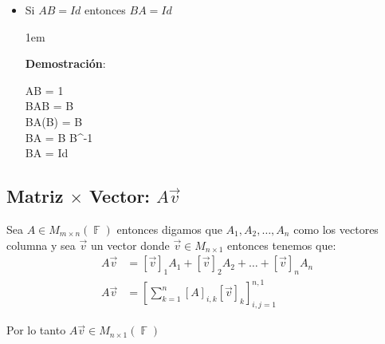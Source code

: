 \documentclass[12pt, fleqn]{report}                             %
\newenvironment{SmallIndentation}[1][0.75em]                    %
        {\begin{adjustwidth}{#1}{}\begin{footnotesize}}             %
        {\end{footnotesize}\end{adjustwidth}}                       %
\def \Eq {equation}                                             %
\newenvironment{MultiLineEquation*}[1]                          %
        {\begin{\Eq*}\begin{alignedat}{#1}}                         %
        {\end{alignedat}\end{\Eq*}}                                 %
\theoremstyle{break}                                            %
\DeclareMathOperator \GenericField {\mathbb{F}}                 %
\newcommand{\Brackets}[1]       {\left[ #1 \right]}             %
\begin{document}
\begin{itemize}
                    \item Si $AB = Id$ entonces $BA = Id$
                        \begin{SmallIndentation}[1em]
                            \textbf{Demostración}:
                        
                            \begin{MultiLineEquation*}{3}
                                AB = 1          \\
                                BAB = B         \\
                                BA(B) = B       \\
                                BA = B B^{-1}   \\
                                BA = Id         \\
                            \end{MultiLineEquation*}
                        
                        \end{SmallIndentation}

                \end{itemize}




            \clearpage
            \subsection{Matriz $\times$ Vector: $A\vec{v}$}
                
                Sea $A \in M_{m \times n}(\GenericField)$ entonces digamos que $A_1, A_2, \dots, A_n$
                como los vectores columna y sea $\vec{v}$ un vector donde $\vec{v} \in M_{n \times 1}$
                entonces tenemos que:
                \begin{align*}
                    A\vec{v} &= [\vec{v}]_1 A_1 + [\vec{v}]_2 A_2 + \dots + [\vec{v}]_n A_n             \\
                    A\vec{v} &= \Brackets{ \sum_{k=1}^{n} [A]_{i, k} [\vec{v}]_k }_{i, j = 1}^{n, 1}
                \end{align*}

                Por lo tanto $A\vec{v} \in M_{n \times 1}(\GenericField)$
\end{document}
